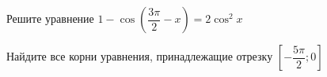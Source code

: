 \begin{ex}
	\begin{condition}
		\begin{enumcols}[label=\asbuk*)]
			\item Решите уравнение \( 1 - \cos{\left(\dfrac{3\pi}{2} - x\right)} = 2\cos^2 x \)
			\item Найдите все корни уравнения, принадлежащие отрезку \( \left[-\dfrac{5\pi}{2};0\right] \)
		\end{enumcols}
	\end{condition}
\end{ex}